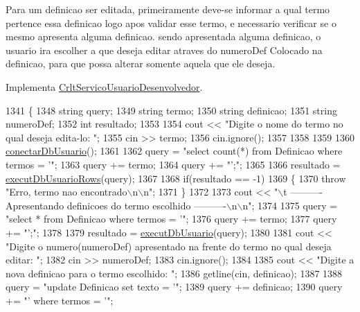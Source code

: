 Para um definicao ser editada, primeiramente deve-\/se informar a qual termo pertence essa definicao logo apos validar esse termo, e necessario verificar se o mesmo apresenta alguma definicao. sendo apresentada alguma definicao, o usuario ira escolher a que deseja editar atraves do numero\+Def Colocado na definicao, para que possa alterar somente aquela que ele deseja.

Implementa \mbox{\hyperlink{class_crlt_servico_usuario_desenvolvedor_ae8e2d1d6954d5c4861d3cc40c525f725}{Crlt\+Servico\+Usuario\+Desenvolvedor}}.


\begin{DoxyCode}
1341  \{
1348    \textcolor{keywordtype}{string} query;
1349    \textcolor{keywordtype}{string} termo;
1350    \textcolor{keywordtype}{string} definicao;
1351    \textcolor{keywordtype}{string} numeroDef;
1352    \textcolor{keywordtype}{int} resultado;
1353 
1354    cout << \textcolor{stringliteral}{"Digite o nome do termo no qual deseja edita-lo: "};
1355    cin >> termo;
1356    cin.ignore();
1357 
1358 
1359 
1360    \mbox{\hyperlink{comando_sql_8cpp_a4f89ddcbc4cf8f2587d89f72f8c7900d}{conectarDbUsuario}}();
1361 
1362    query = \textcolor{stringliteral}{"select count(*) from Definicao where termos = '"};
1363    query += termo;
1364    query += \textcolor{stringliteral}{"';"};
1365 
1366    resultado = \mbox{\hyperlink{comando_sql_8cpp_af54952694f2fa7d76f969fb74b853cb9}{executDbUsuarioRows}}(query);
1367 
1368    \textcolor{keywordflow}{if}(resultado == -1)
1369    \{
1370      \textcolor{keywordflow}{throw} \textcolor{stringliteral}{"Erro, termo nao encontrado\(\backslash\)n\(\backslash\)n"};
1371    \}
1372 
1373    cout << \textcolor{stringliteral}{"\(\backslash\)t ---------- Apresentando definicoes do termo escolhido ----------\(\backslash\)n\(\backslash\)n"};
1374 
1375    query = \textcolor{stringliteral}{"select * from Definicao where termos = '"};
1376    query += termo;
1377    query += \textcolor{stringliteral}{"';"};
1378 
1379    resultado = \mbox{\hyperlink{comando_sql_8cpp_a748197580e7f9acdbf48c78de1f7924b}{executDbUsuario}}(query);
1380 
1381    cout << \textcolor{stringliteral}{"Digite o numero(numeroDef) apresentado na frente do termo no qual deseja editar: "};
1382    cin >> numeroDef;
1383    cin.ignore();
1384 
1385   cout << \textcolor{stringliteral}{"Digite a nova definicao para o termo escolhido: "};
1386   getline(cin, definicao);
1387 
1388   query = \textcolor{stringliteral}{"update Definicao set texto = '"};
1389   query += definicao;
1390   query +=  \textcolor{stringliteral}{"' where termos = '"};

\end{DoxyCode}
